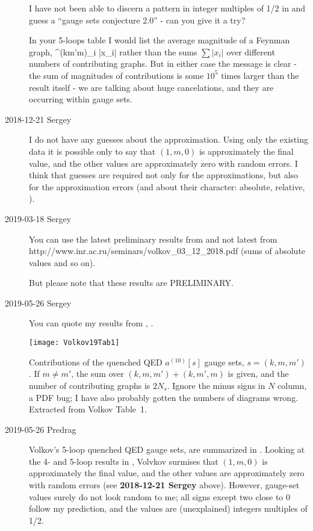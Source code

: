 \begin{description}
I have not been able to discern a pattern in integer multiples of 1/2 in
 and guess a ``gauge sets conjecture 2.0'' - can you
give it a try?

In your 5-loops table I would list the average magnitude of a Feynman graph,
\beq
{} \sum^{({km'm})}_i |x_i|
rather than the sums $\sum |x_i|$ over different numbers of contributing
graphs. But in either case the message is clear - the sum of magnitudes
of contributions is some $10^5$ times larger than the result itself - we
are talking about huge cancelations, and they are occurring within gauge
sets.

\item[2018-12-21 Sergey]
I do not have any guesses about the approximation. Using only the
existing data it is possible only to say that $(1,m,0)$ is
approximately the final value, and the other values are approximately
zero with random errors. I think that guesses are required not only for
the approximations, but also for the approximation errors (and about
their character: absolute, relative, \etc).

\item[2019-03-18 Sergey]
You can use the latest preliminary results from
and not latest from
{http://www.inr.ac.ru/seminars/volkov\_03\_12\_2018.pdf}
(sums of absolute values and so on).

But please note that these results are PRELIMINARY.

\item[2019-05-26 Sergey]
You can quote my results from , .

\begin{table}
\begin{center}
\texttt{[image: Volkov19Tab1]}
\end{center}
\caption{\label{Volkov19Tab1}
Contributions of the quenched QED $a^{(10)}[s]$ gauge sets, $s=(k,m,m')$.
If $m\neq m'$, the sum over $(k,m,m')+(k,m',m)$ is given, and the number
of contributing graphs is $2N_s$. Ignore the minus signs in $N$ column, a
PDF bug; I have also probably gotten the numbers of diagrams wrong.
Extracted from Volkov Table~1.
}
\end{table}

\item[2019-05-26 Predrag]
Volkov's
5-loop quenched QED gauge sets, are summarized in .
Looking at the 4- and 5-loop results in , Volvkov surmises
that $(1,m,0)$ is approximately the final value, and the other values are
approximately zero with random errors (see {\bf 2018-12-21 Sergey} above).
However, gauge-set values surely do not look random to me; all signs except two
close to 0 follow my prediction, and the values are (unexplained) integers
multiples of 1/2.


\end{description}

